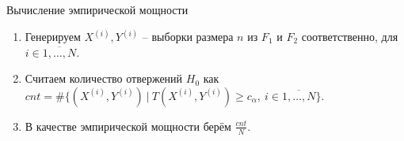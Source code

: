 \documentclass[12pt]{beamer}
\begin{document}
\begin{frame}{Вычисление эмпирической мощности}
	\begin{enumerate}
		\item Генерируем $X^{(i)}, Y^{(i)}$ -- выборки размера $n$ из $F_1$ и $F_2$ соответственно, для $i \in \overline{1,\ldots, N}$.
		\pause
		\item Считаем количество отвержений $H_0$ как $cnt =  \#\{ (X^{(i)},Y^{(i)}) \ | \ T(X^{(i)}, Y^{(i)}) \geqslant c_{\alpha}, \ i \in \overline{1,\ldots, N} \}$.
		\pause
		\item В качестве эмпирической мощности берём $ \frac{cnt}{N}$.
	\end{enumerate}
\end{frame}
\end{document}
